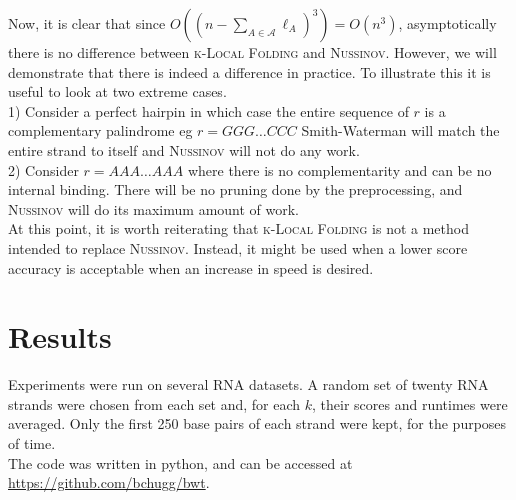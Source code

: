 \documentclass[11pt]{article}
\newcommand{\klf}{\textsc{k-Local Folding}\xspace}
\newcommand{\rf}{\textsc{Nussinov}\xspace}
\newcommand{\al}{\mathscr{A}}
\begin{document}
Now, it is clear that since $O((n-\sum_{A\in\al}\ell_A)^3)=O(n^3)$, asymptotically there is no difference between \klf and \rf. However, we will demonstrate that there is indeed a difference in practice. To illustrate this it is useful to look at two extreme cases.\\

1) Consider a perfect hairpin in which case the entire sequence of $r$ is a complementary palindrome eg $r = GGG \ldots CCC$ Smith-Waterman will match the entire strand to itself and \rf will not do any work. \\
2) Consider $r = AAA \dots AAA$ where there is no complementarity and can be no internal binding. There will be no pruning done by the preprocessing, and \rf will do its maximum amount of work. \\


At this point, it is worth reiterating that \klf is not a method intended to replace \rf. Instead, it might be used when a lower score accuracy is acceptable when an increase in speed is desired. 

\section{Results}
Experiments were run on several RNA datasets. A random set of twenty RNA strands were chosen from each set and, for each $k$, their scores and runtimes were averaged. Only the first 250 base pairs of each strand were kept, for the purposes of time. \\

The code was written in python, and can be accessed at \url{https://github.com/bchugg/bwt}.
\end{document}
